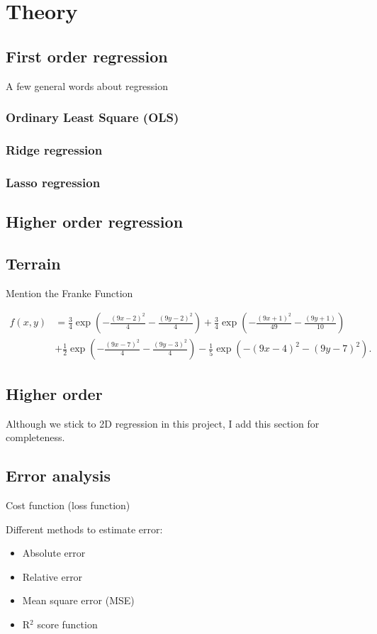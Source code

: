 \section{Theory} \label{sec:theory}

\subsection{First order regression} \label{sec:first_reg}
A few general words about regression

\subsubsection{Ordinary Least Square (OLS)} \label{sec:OLS}

\subsubsection{Ridge regression} \label{sec:ridge}

\subsubsection{Lasso regression} \label{sec:lasso}


\subsection{Higher order regression} \label{sec:higher_reg}

\subsection{Terrain} \label{sec:terrain}
Mention the Franke Function 

\begin{align*}
f(x,y) &= \frac{3}{4}\exp{\left(-\frac{(9x-2)^2}{4} - \frac{(9y-2)^2}{4}\right)}+\frac{3}{4}\exp{\left(-\frac{(9x+1)^2}{49}- \frac{(9y+1)}{10}\right)} \\
&+\frac{1}{2}\exp{\left(-\frac{(9x-7)^2}{4} - \frac{(9y-3)^2}{4}\right)} -\frac{1}{5}\exp{\left(-(9x-4)^2 - (9y-7)^2\right) }.
\end{align*}


\subsection{Higher order}
Although we stick to 2D regression in this project, I add this section for completeness. 


\subsection{Error analysis}

Cost function (loss function) 

Different methods to estimate error:
\begin{itemize}
\item{Absolute error}
\item{Relative error}
\item{Mean square error (MSE)}
\item{R$^2$ score function}
\end{itemize}

